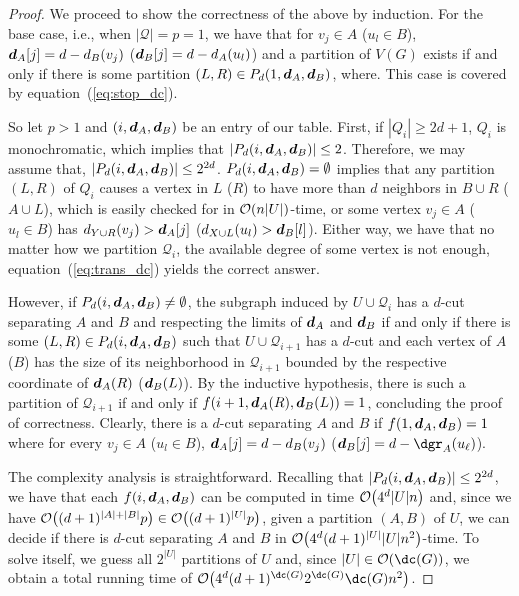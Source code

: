 \begin{proof}
    We proceed to show the correctness of the above by induction.
    For the base case, i.e., when $|\mathcal{Q}| = p = 1$, we have that for $v_j \in A$ ($u_l \in B$),  $\boldsymbol{d}_A[j] = d - d_B(v_j)$ ($\boldsymbol{d}_B[j] = d - d_A(u_l)$) and a partition of $V(G)$ exists if and only if there is some partition $(L, R) \in P_d(1, \boldsymbol{d}_A, \boldsymbol{d}_B)$, where.
    This case is covered by equation~(\ref{eq:stop_dc}).

    So let $p > 1$ and $(i, \boldsymbol{d}_A, \boldsymbol{d}_B)$ be an entry of our table.
    First, if $|Q_i| \geq 2d+1$, $Q_i$ is monochromatic, which implies that $|P_d(i, \boldsymbol{d}_A, \boldsymbol{d}_B)| \leq 2$.
    Therefore, we may assume that, $|P_d(i, \boldsymbol{d}_A, \boldsymbol{d}_B)| \leq 2^{2d}$.
    $P_d(i, \boldsymbol{d}_A, \boldsymbol{d}_B) = \emptyset$ implies that any partition $(L, R)$ of $Q_i$ causes a vertex in $L$ ($R$) to have more than $d$ neighbors in $B \cup R$ ($A \cup L$), which is easily checked for in $\mathcal{O}\!\left(n|U|\right)$-time, or some vertex $v_j \in A$ ($u_l \in B$) has $d_{Y \cup R}(v_j) > \boldsymbol{d}_A[j]$ ($d_{X \cup L}(u_l) > \boldsymbol{d}_B[l]$).
    Either way, we have that no matter how we partition $\mathcal{Q}_i$, the available degree of some vertex is not enough, equation~(\ref{eq:trans_dc}) yields the correct answer.

    However, if $P_d(i, \boldsymbol{d}_A, \boldsymbol{d}_B) \neq \emptyset$, the subgraph induced by $U \cup \mathcal{Q}_i$ has a $d$-cut separating $A$ and $B$ and respecting the limits of $\boldsymbol{d}_A$ and $\boldsymbol{d}_B$ if and only if there is some $(L, R) \in P_d(i, \boldsymbol{d}_A, \boldsymbol{d}_B)$ such that $U \cup \mathcal{Q}_{i+1}$ has a $d$-cut and each vertex of $A$ ($B$) has the size of its neighborhood in $\mathcal{Q}_{i+1}$ bounded by the respective coordinate of $\boldsymbol{d}_A(R)$ ($\boldsymbol{d}_B(L)$).
    By the inductive hypothesis, there is such a partition of $\mathcal{Q}_{i+1}$ if and only if $f(i+1, \boldsymbol{d}_A(R), \boldsymbol{d}_B(L)) = 1$, concluding the proof of correctness.
    Clearly, there is a $d$-cut separating $A$ and $B$ if $f(1, \boldsymbol{d}_A, \boldsymbol{d}_B) = 1$ where for every $v_j \in A$ ($u_l \in B$),  $\boldsymbol{d}_A[j] = d - d_B(v_j)$ ($\bmd_B[j] = d - \dgr_A(u_{\ell})$).

    The complexity analysis is straightforward.
    Recalling that $|P_d(i, \boldsymbol{d}_A, \boldsymbol{d}_B)| \leq 2^{2d}$, we have that each $f(i, \boldsymbol{d}_A, \boldsymbol{d}_B)$ can be computed in time $\mathcal{O}\!\left(4^d|U|n\right)$ and, since we have $\mathcal{O}\!\left((d+1)^{|A| + |B|}p\right) \in \mathcal{O}\!\left((d+1)^{|U|}p\right)$, given a partition $(A, B)$ of $U$, we can decide if there is $d$-cut separating $A$ and $B$ in $\mathcal{O}\!\left(4^d(d+1)^{|U|}|U|n^2\right)$-time.
    To solve  itself, we guess all $2^{|U|}$ partitions of $U$ and, since $|U| \in \bigO{\dc(G)}$, we obtain a total running time of $\bigO{4^d(d+1)^{\dc(G)}2^{\dc(G)}\dc(G)n^2}$.
\end{proof}

